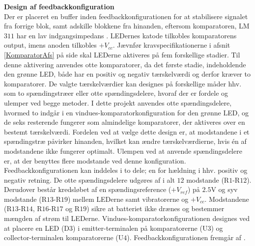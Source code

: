 \noindent\textbf{Design af feedbackkonfiguration} \\
Der er placeret en buffer inden feedbackkonfigurationen for at stabilisere signalet fra forrige blok, samt adskille blokkene fra hinanden, eftersom komparatoren, LM$311$ har en lav indgangsimpedans \cite{Instruments2015}. LEDernes katode tilkobles komparatorens output, imens anoden tilkobles $+V_{cc}$. Jævnfør kravspecifikationerne i afsnit \ref{KomparatorAfs} på side \pageref{KomparatorAfs} skal LEDerne aktiveres på fem forskellige stadier. Til denne aktivering anvendes otte komparatorer, da det første stadie, indeholdende den grønne LED, både har en positiv og negativ tærskelværdi og derfor kræver to komparatorer. De valgte tærskelværdier kan designes på forskellige måder hhv. som to spændingstræer eller otte spændingsdelere, hvoraf der er fordele og ulemper ved begge metoder. I dette projekt anvendes otte spændingsdelere, hvormed to indgår i en vindues-komparatorkonfiguration for den grønne LED, og de seks resterende fungerer som almindelige komparatorer, der aktiveres over en bestemt tærskelværdi. Fordelen ved at vælge dette design er, at modstandene i et spændingstræ påvirker hinanden, hvilket kan ændre tærskelværdierne, hvis én af modstandene ikke fungerer optimalt. Ulempen ved at anvende spændingsdelere er, at der benyttes flere modstande ved denne konfiguration. Feedbackkonfigurationen kan inddeles i to dele; en for hældning i hhv. positiv og negativ retning. De otte spændingsdelere udgøres af i alt $12$ modstande (R$1$-R$12$). Derudover består kredsløbet af en spændingsreference ($+V_{ref}$) på $2.5$V og syv modstande (R$13$-R$19$) mellem LEDerne samt vibratorerne og $+V_{cc}$. Modstandene (R$13$-R$14$, R$16$-R$17$ og R$19$) sikre at batteriet ikke drænes og bestemmer mængden af strøm til LEDerne. Vindues-komparatorkonfigurationen designes ved at placere en LED (D$3$) i emitter-terminalen på komparatorerne (U$3$) og collector-terminalen komparatorerne (U$4$). Feedbackkonfigurationen fremgår af . 

